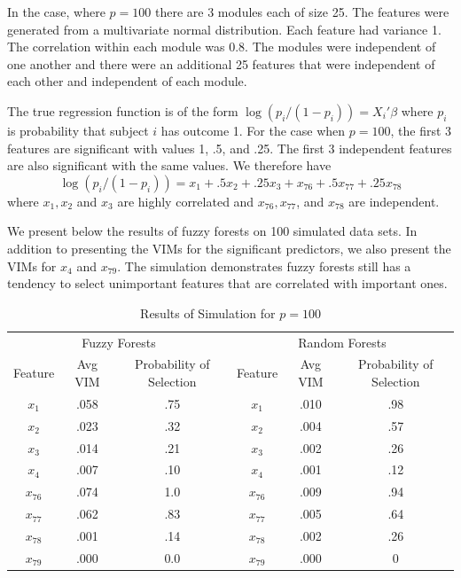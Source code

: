 \documentclass[article,shortnames]{jss}
\begin{document}
In the case, where $p=100$ there are 3 modules each of size 25.  The features were generated from a multivariate
normal distribution.  Each feature had variance 1.  The correlation within each module was 0.8.  The modules were independent of one 
another and there were an additional 25 features that were independent of each other and independent of each module.  

The true regression function is of the form $\log(p_{i}/(1-p_{i}))=X_{i}'\beta$ where $p_{i}$ is probability that
subject $i$ has outcome 1.   For the case when $p=100$,  the first 3 features are significant with values
1, .5, and .25.  The first 3 independent features are also significant with the same values.  We therefore have
\begin{equation}
\log(p_{i}/(1-p_{i})) = x_{1} + .5x_{2} + .25x_{3} + x_{76} + .5x_{77} + .25x_{78}
\end{equation}
where $x_{1}, x_{2}$ and $x_{3}$ are highly correlated and $ x_{76}, x_{77}$, and $x_{78}$ are independent.

We present below the results of fuzzy forests on 100 simulated data sets.  In addition to presenting the VIMs
for the significant predictors, we also present the VIMs for $x_{4}$ and $x_{79}$.  The simulation 
demonstrates fuzzy forests still has a tendency to select unimportant features that are correlated with important 
ones.   
\begin{table}
\centering
\caption{Results of Simulation for $p=100$}
\begin{tabular}[bc]{c c c | c c c}
\hline
\multicolumn{3}{c|}{Fuzzy Forests} & \multicolumn{3}{c}{Random Forests}\\
Feature&Avg VIM& Probability of Selection & Feature & Avg VIM & Probability of Selection\\
\hline
$x_{1}$  & .058 &  .75  & $x_{1}$ & .010 & .98\\
$x_{2}$  & .023 &  .32 & $x_{2}$ & .004 & .57\\
$x_{3}$  & .014 &  .21 & $x_{3}$ & .002 & .26\\
$x_{4}$ & .007 &  .10 & $x_{4}$ & .001 & .12\\
$x_{76}$ & .074 & 1.0 & $x_{76}$ & .009 & .94\\
$x_{77}$ & .062 & .83 & $x_{77}$ & .005 & .64\\
$x_{78}$ & .001 & .14 & $x_{78}$ & .002 & .26\\
$x_{79}$ & .000 & 0.0 & $x_{79}$ & .000 & 0
\end{tabular}
\end{table}
\end{document}
